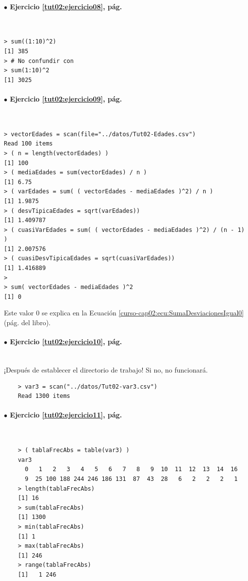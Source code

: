 \documentclass[10pt,a4paper]{article}\usepackage[]{graphicx}\usepackage[]{color}
\begin{document}
\paragraph{\bf $\bullet$ Ejercicio \ref{tut02:ejercicio08}, pág. \pageref{tut02:ejercicio08}}
\label{tut02:ejercicio08:sol}\quad\\
\begin{verbatim}
> sum((1:10)^2)
[1] 385
> # No confundir con
> sum(1:10)^2
[1] 3025
\end{verbatim}

\paragraph{\bf $\bullet$ Ejercicio \ref{tut02:ejercicio09}, pág. \pageref{tut02:ejercicio09}}
\label{tut02:ejercicio09:sol}\quad\\
\begin{verbatim}
> vectorEdades = scan(file="../datos/Tut02-Edades.csv")
Read 100 items
> ( n = length(vectorEdades) )
[1] 100
> ( mediaEdades = sum(vectorEdades) / n )
[1] 6.75
> ( varEdades = sum( ( vectorEdades - mediaEdades )^2) / n )
[1] 1.9875
> ( desvTipicaEdades = sqrt(varEdades))
[1] 1.409787
> ( cuasiVarEdades = sum( ( vectorEdades - mediaEdades )^2) / (n - 1) )
[1] 2.007576
> ( cuasiDesvTipicaEdades = sqrt(cuasiVarEdades))
[1] 1.416889
>
> sum( vectorEdades - mediaEdades )^2
[1] 0
\end{verbatim}
Este valor $0$ se explica en la Ecuación \ref{curso-cap02:ecu:SumaDesviacionesIgual0} (pág. \pageref{curso-cap02:ecu:SumaDesviacionesIgual0} del libro).

\paragraph{\bf $\bullet$ Ejercicio \ref{tut02:ejercicio10},  pág. \pageref{tut02:ejercicio10}}
\label{tut02:ejercicio10:sol}\quad\\
¡Después de establecer el directorio de trabajo! Si no, no funcionará.
\begin{verbatim}
    > var3 = scan("../datos/Tut02-var3.csv")
    Read 1300 items
\end{verbatim}

\paragraph{\bf $\bullet$ Ejercicio \ref{tut02:ejercicio11},  pág. \pageref{tut02:ejercicio11}}
\label{tut02:ejercicio11:sol}\quad\\
\begin{verbatim}
    > ( tablaFrecAbs = table(var3) )
    var3
      0   1   2   3   4   5   6   7   8   9  10  11  12  13  14  16
      9  25 100 188 244 246 186 131  87  43  28   6   2   2   2   1
    > length(tablaFrecAbs)
    [1] 16
    > sum(tablaFrecAbs)
    [1] 1300
    > min(tablaFrecAbs)
    [1] 1
    > max(tablaFrecAbs)
    [1] 246
    > range(tablaFrecAbs)
    [1]   1 246
\end{verbatim}
\end{document}
